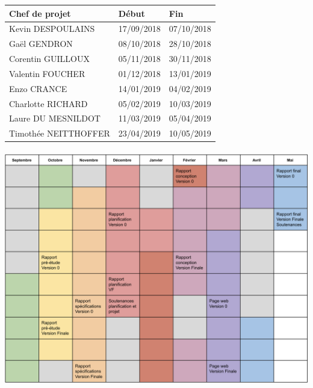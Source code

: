 \begin{mdframed}[frametitle={Figure 14 : Planning des rotations du rôle de chef de projet}, innerbottommargin=10]
\begin{center}
\begin{tabular}{ | l | l | l | }
\hline
{\textbf{Chef de projet}}   &   {\textbf{Début}}    &   {\textbf{Fin}}  \\ \hline \rowcolor[RGB]{182, 215, 168}
{Kevin DESPOULAINS}         &   {17/09/2018}        &	{07/10/2018}    \\ \hline \rowcolor[RGB]{255, 229, 153}
{Gaël GENDRON}              &   {08/10/2018}	    &	{28/10/2018}    \\ \hline \rowcolor[RGB]{249, 203, 156}
{Corentin GUILLOUX}         &   {05/11/2018}	    &	{30/11/2018}    \\ \hline \rowcolor[RGB]{234, 153, 153}
{Valentin FOUCHER}          &   {01/12/2018}	    &	{13/01/2019}    \\ \hline \rowcolor[RGB]{221, 126, 107}
{Enzo CRANCE}               &   {14/01/2019}	    &	{04/02/2019}    \\ \hline \rowcolor[RGB]{213, 166, 189}
{Charlotte RICHARD}         &   {05/02/2019}	    &	{10/03/2019}    \\ \hline \rowcolor[RGB]{180, 167, 214}
{Laure DU MESNILDOT}        &   {11/03/2019}	    &	{05/04/2019}    \\ \hline \rowcolor[RGB]{159, 197, 232}
{Timothée NEITTHOFFER}      &	{23/04/2019}	    &	{10/05/2019}    \\ \hline
\end{tabular}
\paragraph{}
\includegraphics[width=\linewidth]{planning.png}
\end{center}
\end{mdframed}
    
